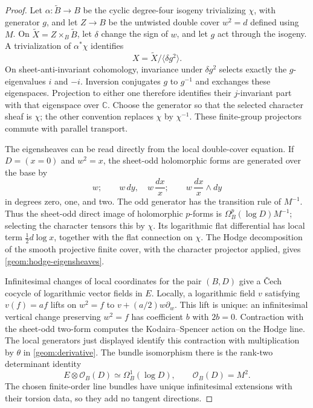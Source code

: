 \documentclass[11pt]{amsart}
\newcommand{\C}{\mathbb C}
\theoremstyle{definition}
\theoremstyle{remark}
\numberwithin{equation}{section}
\begin{document}
\begin{proof}
Let $\alpha:\widetilde B\to B$ be the cyclic degree-four isogeny
trivializing $\chi$, with generator $g$, and let $Z\to B$ be the
untwisted double cover $w^2=d$ defined using $M$.  On
$\widetilde X=Z\times_B\widetilde B$, let $\delta$ change the sign of
$w$, and let $g$ act through the isogeny.  A trivialization of
$\alpha^*\chi$ identifies
\[
 X=\widetilde X/\langle\delta g^2\rangle.
\]
On sheet-anti-invariant cohomology, invariance under $\delta g^2$
selects exactly the $g$-eigenvalues $i$ and $-i$.  Inversion
conjugates $g$ to $g^{-1}$ and exchanges these eigenspaces.
Projection to either one therefore identifies their $j$-invariant
part with that eigenspace over $\C$.  Choose the generator so that
the selected character sheaf is $\chi$; the other convention
replaces $\chi$ by $\chi^{-1}$.  These finite-group projectors
commute with parallel transport.

The eigensheaves can be read directly from the local double-cover
equation.  If $D=(x=0)$ and $w^2=x$, the sheet-odd holomorphic forms
are generated over the base by
\[
 w;\qquad w\,dy,\quad w\,\frac{dx}{x};
 \qquad w\,\frac{dx}{x}\wedge dy
\]
in degrees zero, one, and two.  The odd generator has the transition
rule of $M^{-1}$.  Thus the sheet-odd direct image of holomorphic
$p$-forms is $\Omega_B^p(\log D)M^{-1}$; selecting the character
tensors this by $\chi$.  Its logarithmic flat differential has
local term $\tfrac12d\log x$, together with the flat connection on
$\chi$.  The Hodge decomposition of the smooth
projective finite cover, with the character projector applied, gives
\eqref{geom:hodge-eigensheaves}.

Infinitesimal changes of local coordinates for the pair $(B,D)$
give a \v{C}ech cocycle of logarithmic vector fields in $E$.
Locally, a logarithmic field $v$ satisfying $v(f)=af$ lifts on
$w^2=f$ to $v+(a/2)w\partial_w$.  This lift is unique: an
infinitesimal vertical change preserving $w^2=f$ has coefficient
$b$ with $2b=0$.  Contraction with the sheet-odd
two-form computes the Kodaira--Spencer action on the Hodge line.
The local generators just displayed identify this contraction with
multiplication by $\theta$ in \eqref{geom:derivative}.  The bundle
isomorphism there is the rank-two determinant identity
\[
 E\otimes\mathcal O_B(D)\simeq\Omega_B^1(\log D),
 \qquad \mathcal O_B(D)=M^2.
\]
The chosen finite-order line bundles have unique infinitesimal
extensions with their torsion data, so they add no tangent directions.


\end{proof}
\end{document}
